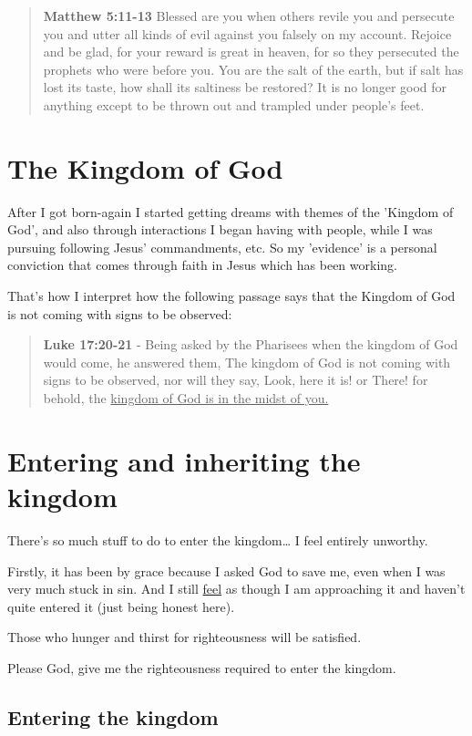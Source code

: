 \documentclass[11pt]{article}
\begin{document}
\begin{quote}
\textbf{Matthew 5:11-13}  Blessed are you when others revile you and persecute you and utter all kinds of evil against you falsely on my account. Rejoice and be glad, for your reward is great in heaven, for so they persecuted the prophets who were before you. You are the salt of the earth, but if salt has lost its taste, how shall its saltiness be restored? It is no longer good for anything except to be thrown out and trampled under people's feet.
\end{quote}

\section{The Kingdom of God}
\label{sec:org2d5ca1a}
After I got born-again I started getting dreams with themes of the 'Kingdom of God', and also through interactions I began having with people, while I was pursuing following Jesus' commandments, etc. So my 'evidence' is a personal conviction that comes through faith in Jesus which has been working.

That's how I interpret how the following passage says that the Kingdom of God is not coming with signs to be observed:

\begin{quote}
\textbf{Luke 17:20-21} - Being asked by the Pharisees when the kingdom of God would come, he answered them, The kingdom of God is not coming with signs to be observed, nor will they say, Look, here it is! or There! for behold, the \uline{kingdom of God is in the midst of you.}
\end{quote}

\section{Entering and inheriting the kingdom}
\label{sec:orgee9f42f}
There's so much stuff to do to enter the kingdom\ldots{} I feel entirely unworthy.

Firstly, it has been by grace because I asked God to save me, even when I was very much stuck in sin. And I still \uline{feel} as though I am approaching it and haven't quite entered it (just being honest here).

Those who hunger and thirst for righteousness will be satisfied.

Please God, give me the righteousness required to enter the kingdom.

\subsection{Entering the kingdom}
\label{sec:org10b5c5d}
\end{document}
